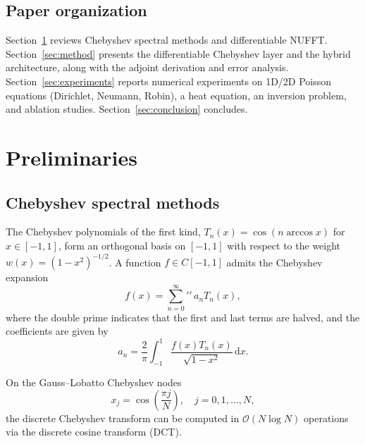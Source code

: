 \documentclass[sn-mathphys,Numbered]{sn-jnl}
\theoremstyle{thmstyleone}
\theoremstyle{thmstyletwo}
\theoremstyle{thmstylethree}
\newcommand{\dd}{\mathrm{d}}
\begin{document}
\subsection{Paper organization}
Section~\ref{sec:prelim} reviews Chebyshev spectral methods and differentiable NUFFT. Section~\ref{sec:method} presents the differentiable Chebyshev layer and the hybrid architecture, along with the adjoint derivation and error analysis. Section~\ref{sec:experiments} reports numerical experiments on 1D/2D Poisson equations (Dirichlet, Neumann, Robin), a heat equation, an inversion problem, and ablation studies. Section~\ref{sec:conclusion} concludes.

\section{Preliminaries}\label{sec:prelim}

\subsection{Chebyshev spectral methods}\label{subsec:chebyshev}

The Chebyshev polynomials of the first kind, $T_n(x) = \cos(n \arccos x)$ for $x \in [-1, 1]$, form an orthogonal basis on $[-1, 1]$ with respect to the weight $w(x) = (1-x^2)^{-1/2}$. A function $f \in C[-1,1]$ admits the Chebyshev expansion
\begin{equation}
    f(x) = \sum_{n=0}^{\infty} \!\!\!\!\prime\prime\, a_n T_n(x),
    \label{eq:cheb_expansion}
\end{equation}
where the double prime indicates that the first and last terms are halved, and the coefficients are given by
\begin{equation}
    a_n = \frac{2}{\pi} \int_{-1}^{1} \frac{f(x) T_n(x)}{\sqrt{1-x^2}} \, \dd x.
    \label{eq:cheb_coeff}
\end{equation}

On the Gauss--Lobatto Chebyshev nodes
\begin{equation}
    x_j = \cos\left(\frac{\pi j}{N}\right), \quad j = 0, 1, \ldots, N,
    \label{eq:cheb_nodes}
\end{equation}
the discrete Chebyshev transform can be computed in $\mathcal{O}(N \log N)$ operations via the discrete cosine transform (DCT).
\end{document}
